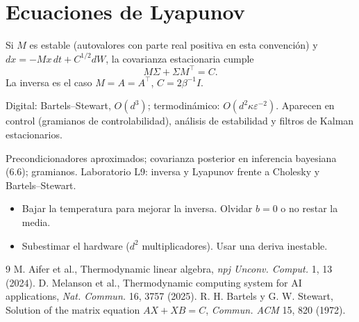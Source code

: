 \documentclass[11pt,a4paper]{article}
\begin{document}
\section{Ecuaciones de Lyapunov}
\begin{definicion}[ (Lyapunov)]
Si $M$ es estable (autovalores con parte real positiva en esta convención) y $dx=-Mx\,dt+C^{1/2}dW$, la covarianza estacionaria cumple
\[M\Sigma+\Sigma M^\top=C.\]
La inversa es el caso $M=A=A^\top$, $C=2\beta^{-1}I$.
\end{definicion}
Digital: Bartels--Stewart, $O(d^3)$; termodinámico: $O(d^2\kappa\varepsilon^{-2})$. Aparecen en control (gramianos de controlabilidad), análisis de estabilidad y
filtros de Kalman estacionarios.

\begin{aplicacion}
Precondicionadores aproximados; covarianza posterior en inferencia bayesiana (6.6); gramianos. Laboratorio L9: inversa y Lyapunov frente a Cholesky y Bartels--Stewart.
\end{aplicacion}

\begin{error}
\begin{itemize}[nosep]
\item Bajar la temperatura para mejorar la inversa. \quad Olvidar $b=0$ o no restar la media.
\item Subestimar el hardware ($d^2$ multiplicadores). \quad Usar una deriva inestable.
\end{itemize}
\end{error}

\begin{thebibliography}{9}\small
{} M. Aifer et al., Thermodynamic linear algebra, \emph{npj Unconv. Comput.} 1, 13 (2024).
 D. Melanson et al., Thermodynamic computing system for AI applications, \emph{Nat. Commun.} 16, 3757 (2025).
 R. H. Bartels y G. W. Stewart, Solution of the matrix equation $AX+XB=C$, \emph{Commun. ACM} 15, 820 (1972).
\end{thebibliography}
\end{document}

